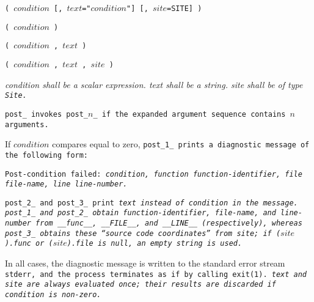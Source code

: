 
\s\s\s\tt{(} $condition$
[\tt{,} $text$\tt{="}$condition$\tt{"}]
[\tt{,} $site$\tt{=SITE}] \tt{)}

\s\tt{(} $condition$ \tt{)}

\s\tt{(} $condition$
\phantom{[}\tt{,} $text$\phantom{]} \tt{)}

\s\tt{(} $condition$
\phantom{[}\tt{,} $text$\phantom{]}
\tt{,} $site$ \tt{)}


\it{condition} shall be a scalar expression.
\it{text} shall be a string.
\it{site} shall be of type \tt{Site}.


\tt{post_} invokes \tt{post_}$n$\_ if the
expanded argument sequence contains $n$ arguments.

If $condition$ compares equal to zero, \tt{post_1_}
prints a diagnostic message of the following form:

\begin{center}
\tt{Post-condition failed:} \it{condition}\tt{, function}
\it{function-identifier}\tt{, file}
\it{file-name}\tt{, line}
\it{line-number}\tt{.}
\end{center}

\tt{post_2_} and \tt{post_3_} print \it{text}
instead of \it{condition} in the message.
\tt{post_1_} and \tt{post_2_} obtain \it{function-identifier}, \it{file-name},
and \it{line-number} from \tt{__func__}, \tt{__FILE__}, and \tt{__LINE__}
(respectively), whereas \tt{post_3_} obtains these ``source code
coordinates'' from \it{site}; if \tt{(}$site$\tt{).func} or
\tt{(}$site$\tt{).file} is null, an empty string is used.

In all cases, the diagnostic message is written to the standard error stream
\tt{stderr}, and the process terminates as if by calling \tt{exit(1)}.
\it{text} and \it{site} are always evaluated once;
their results are discarded if \it{condition} is non-zero.
